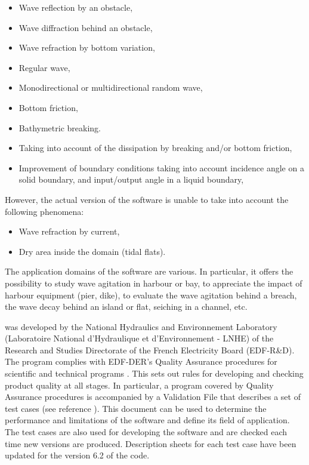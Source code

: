 \begin{itemize}
\item  Wave reflection by an obstacle,

\item  Wave diffraction behind an obstacle,

\item  Wave refraction by bottom variation,

\item  Regular wave,

\item  Monodirectional or multidirectional random wave,

\item  Bottom friction,

\item  Bathymetric breaking.

\item  Taking into account of the dissipation by breaking and/or bottom friction,

\item  Improvement of boundary conditions taking into account incidence angle on a solid boundary, and input/output angle in a liquid boundary,
\end{itemize}

However, the actual version of the software is unable to take into account the following phenomena:

\begin{itemize}
\item  Wave refraction by current,

\item  Dry area inside the domain (tidal flats).
\end{itemize}

The application domains of the software are various. In particular, it offers
the possibility to study wave agitation in harbour or bay, to appreciate the
impact of harbour equipment (pier, dike), to evaluate the wave agitation behind
a breach, the wave decay behind an island or flat, seiching in a channel, etc.

\artemis{} was developed by the National Hydraulics and Environnement
Laboratory (Laboratoire National d'Hydraulique et d'Environnement - LNHE) of
the Research and Studies Directorate of the French Electricity Board
(EDF-R\&D). The program complies with EDF-DER's Quality Assurance procedures
for scientific and technical programs \cite{QualityGroup1993}. This sets out rules
for developing and checking product quality at all stages. In particular, a
program covered by Quality Assurance procedures is accompanied by a Validation
File that describes a set of test cases (see reference \cite{ArtVal1997}).
This document can be used to determine the performance and limitations of the
software and define its field of application. The test cases are also used for
developing the software and are checked each time new versions are produced.
Description sheets for each test case have been updated for the version 6.2 of
the code.


